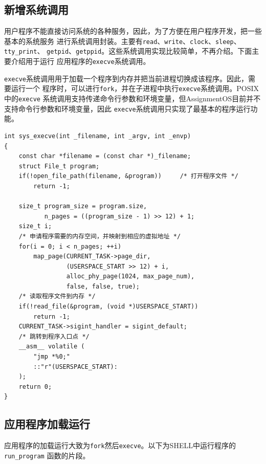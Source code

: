 \documentclass[a4paper, adobefonts]{ctexart}
\begin{document}
\subsection{新增系统调用}
用户程序不能直接访问系统的各种服务，因此，为了方便在用户程序开发，把一些基本的系统服务
进行系统调用封装。主要有\verb|read|、\verb|write|、\verb|clock|、\verb|sleep|、\verb|tty_print|、
\verb|getpid|、\verb|getppid|。这些系统调用实现比较简单，不再介绍。下面主要介绍用于运行
应用程序的\verb|execve|系统调用。

\verb|execve|系统调用用于加载一个程序到内存并把当前进程切换成该程序。因此，需要运行一个
程序时，可以进行\verb|fork|，并在子进程中执行\verb|execve|系统调用。POSIX中的\verb|execve|
系统调用支持传递命令行参数和环境变量，但AssignmentOS目前并不支持命令行参数和环境变量，因此
\verb|execve|系统调用只实现了最基本的程序运行功能。

\begin{verbatim}
int sys_execve(int _filename, int _argv, int _envp)
{
    const char *filename = (const char *)_filename;
    struct File_t program;
    if(!open_file_path(filename, &program))     /* 打开程序文件 */
        return -1;

    size_t program_size = program.size,
           n_pages = ((program_size - 1) >> 12) + 1;
    size_t i;
    /* 申请程序需要的内存空间，并映射到相应的虚拟地址 */
    for(i = 0; i < n_pages; ++i)
        map_page(CURRENT_TASK->page_dir,
                 (USERSPACE_START >> 12) + i,
                 alloc_phy_page(1024, max_page_num),
                 false, false, true);
    /* 读取程序文件到内存 */
    if(!read_file(&program, (void *)USERSPACE_START))
        return -1;
    CURRENT_TASK->sigint_handler = sigint_default;
    /* 跳转到程序入口点 */
    __asm__ volatile (
        "jmp *%0;"
        ::"r"(USERSPACE_START):
    );
    return 0;
}
\end{verbatim}

\subsection{应用程序加载运行}
应用程序的加载运行大致为\verb|fork|然后\verb|execve|。以下为SHELL中运行程序的\verb|run_program|
函数的片段。
\end{document}
